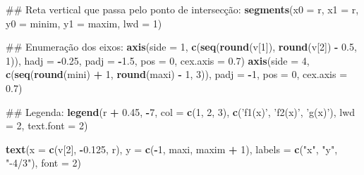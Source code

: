 \documentclass[]{book}
\newenvironment{Shaded}{\begin{snugshade}}{\end{snugshade}}
\newcommand{\KeywordTok}[1]{\textcolor[rgb]{0.13,0.29,0.53}{\textbf{#1}}}
\newcommand{\DataTypeTok}[1]{\textcolor[rgb]{0.13,0.29,0.53}{#1}}
\newcommand{\DecValTok}[1]{\textcolor[rgb]{0.00,0.00,0.81}{#1}}
\newcommand{\FloatTok}[1]{\textcolor[rgb]{0.00,0.00,0.81}{#1}}
\newcommand{\StringTok}[1]{\textcolor[rgb]{0.31,0.60,0.02}{#1}}
\newcommand{\OperatorTok}[1]{\textcolor[rgb]{0.81,0.36,0.00}{\textbf{#1}}}
\newcommand{\NormalTok}[1]{#1}
\begin{document}
\begin{enumerate}
\begin{Shaded}
\begin{Highlighting}[]
\NormalTok{##  Reta vertical que passa pelo ponto de intersecção:}
\KeywordTok{segments}\NormalTok{(}\DataTypeTok{x0 =}\NormalTok{ r, }\DataTypeTok{x1 =}\NormalTok{ r,}
     \DataTypeTok{y0 =}\NormalTok{ minim, }\DataTypeTok{y1 =}\NormalTok{ maxim, }\DataTypeTok{lwd =} \DecValTok{1}\NormalTok{)}

\NormalTok{##  Enumeração dos eixos:}
\KeywordTok{axis}\NormalTok{(}\DataTypeTok{side =} \DecValTok{1}\NormalTok{, }\KeywordTok{c}\NormalTok{(}\KeywordTok{seq}\NormalTok{(}\KeywordTok{round}\NormalTok{(v[}\DecValTok{1}\NormalTok{]), }\KeywordTok{round}\NormalTok{(v[}\DecValTok{2}\NormalTok{]) }\OperatorTok{-}\StringTok{ }\FloatTok{0.5}\NormalTok{, }\DecValTok{1}\NormalTok{)),}
 \DataTypeTok{hadj =} \OperatorTok{-}\FloatTok{0.25}\NormalTok{, }\DataTypeTok{padj =} \OperatorTok{-}\FloatTok{1.5}\NormalTok{, }\DataTypeTok{pos =} \DecValTok{0}\NormalTok{, }\DataTypeTok{cex.axis =} \FloatTok{0.7}\NormalTok{)}
\KeywordTok{axis}\NormalTok{(}\DataTypeTok{side =} \DecValTok{4}\NormalTok{, }\KeywordTok{c}\NormalTok{(}\KeywordTok{seq}\NormalTok{(}\KeywordTok{round}\NormalTok{(mini) }\OperatorTok{+}\StringTok{ }\DecValTok{1}\NormalTok{, }\KeywordTok{round}\NormalTok{(maxi) }\OperatorTok{-}\StringTok{ }\DecValTok{1}\NormalTok{, }\DecValTok{3}\NormalTok{)),}
 \DataTypeTok{padj =} \OperatorTok{-}\DecValTok{1}\NormalTok{, }\DataTypeTok{pos =} \DecValTok{0}\NormalTok{, }\DataTypeTok{cex.axis =} \FloatTok{0.7}\NormalTok{)}

\NormalTok{##  Legenda:}
\KeywordTok{legend}\NormalTok{(r }\OperatorTok{+}\StringTok{ }\FloatTok{0.45}\NormalTok{, }\OperatorTok{-}\DecValTok{7}\NormalTok{, }\DataTypeTok{col =} \KeywordTok{c}\NormalTok{(}\DecValTok{1}\NormalTok{, }\DecValTok{2}\NormalTok{, }\DecValTok{3}\NormalTok{), }\KeywordTok{c}\NormalTok{(}\StringTok{'f1(x)'}\NormalTok{, }\StringTok{'f2(x)'}\NormalTok{, }\StringTok{'g(x)'}\NormalTok{),}
   \DataTypeTok{lwd =} \DecValTok{2}\NormalTok{, }\DataTypeTok{text.font =} \DecValTok{2}\NormalTok{)}

\KeywordTok{text}\NormalTok{(}\DataTypeTok{x =} \KeywordTok{c}\NormalTok{(v[}\DecValTok{2}\NormalTok{], }\OperatorTok{-}\FloatTok{0.125}\NormalTok{, r), }\DataTypeTok{y =} \KeywordTok{c}\NormalTok{(}\OperatorTok{-}\DecValTok{1}\NormalTok{, maxi, maxim }\OperatorTok{+}\StringTok{ }\DecValTok{1}\NormalTok{),}
 \DataTypeTok{labels =} \KeywordTok{c}\NormalTok{(}\StringTok{"x"}\NormalTok{, }\StringTok{"y"}\NormalTok{, }\StringTok{"-4/3"}\NormalTok{), }\DataTypeTok{font =} \DecValTok{2}\NormalTok{)}
\end{Highlighting}
\end{Shaded}


\end{enumerate}
\end{document}

